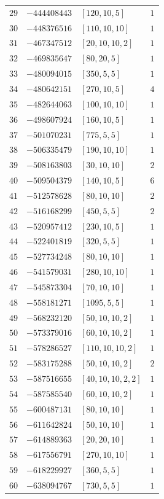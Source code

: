 \documentclass[11pt]{article}
\begin{document}
\begin{center}
\begin{longtable}{r r l c}
$29$ & $-444408443$ & $[120,10,5]$ & $1$\\
$30$ & $-448376516$ & $[110,10,10]$ & $1$\\
$31$ & $-467347512$ & $[20,10,10,2]$ & $1$\\
$32$ & $-469835647$ & $[80,20,5]$ & $1$\\
$33$ & $-480094015$ & $[350,5,5]$ & $1$\\
$34$ & $-480642151$ & $[270,10,5]$ & $4$\\
$35$ & $-482644063$ & $[100,10,10]$ & $1$\\
$36$ & $-498607924$ & $[160,10,5]$ & $1$\\
$37$ & $-501070231$ & $[775,5,5]$ & $1$\\
$38$ & $-506335479$ & $[190,10,10]$ & $1$\\
$39$ & $-508163803$ & $[30,10,10]$ & $2$\\
$40$ & $-509504379$ & $[140,10,5]$ & $6$\\
$41$ & $-512578628$ & $[80,10,10]$ & $2$\\
$42$ & $-516168299$ & $[450,5,5]$ & $2$\\
$43$ & $-520957412$ & $[230,10,5]$ & $1$\\
$44$ & $-522401819$ & $[320,5,5]$ & $1$\\
$45$ & $-527734248$ & $[80,10,10]$ & $1$\\
$46$ & $-541579031$ & $[280,10,10]$ & $1$\\
$47$ & $-545873304$ & $[70,10,10]$ & $1$\\
$48$ & $-558181271$ & $[1095,5,5]$ & $1$\\
$49$ & $-568232120$ & $[50,10,10,2]$ & $1$\\
$50$ & $-573379016$ & $[60,10,10,2]$ & $1$\\
$51$ & $-578286527$ & $[110,10,10,2]$ & $1$\\
$52$ & $-583175288$ & $[50,10,10,2]$ & $2$\\
$53$ & $-587516655$ & $[40,10,10,2,2]$ & $1$\\
$54$ & $-587585540$ & $[60,10,10,2]$ & $1$\\
$55$ & $-600487131$ & $[80,10,10]$ & $1$\\
$56$ & $-611642824$ & $[50,10,10]$ & $1$\\
$57$ & $-614889363$ & $[20,20,10]$ & $1$\\
$58$ & $-617556791$ & $[270,10,10]$ & $1$\\
$59$ & $-618229927$ & $[360,5,5]$ & $1$\\
$60$ & $-638094767$ & $[730,5,5]$ & $1$\\

\end{longtable}
\end{center}
\end{document}
